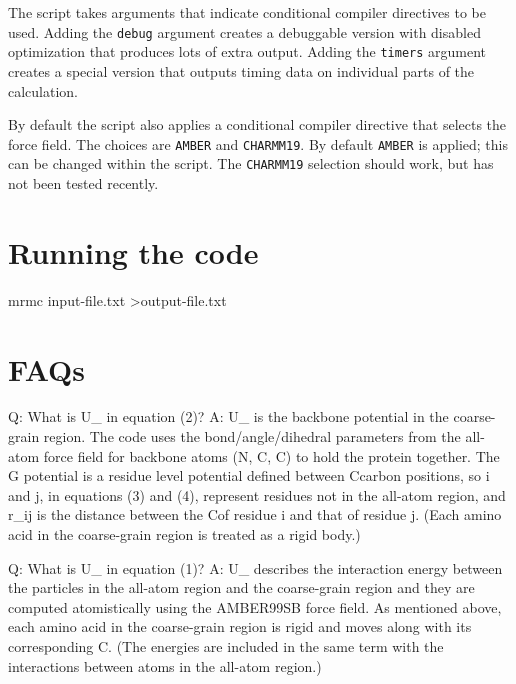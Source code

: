 \documentclass{article}      %
\begin{document}
The script takes arguments that indicate conditional compiler directives to be used.  Adding the \verb+debug+ argument creates a debuggable version with disabled optimization that produces lots of extra output.  Adding the \verb+timers+ argument creates a special version that outputs timing data on individual parts of the calculation.

By default the script also applies a conditional compiler directive that selects the force field.  The choices are \verb+AMBER+ and \verb+CHARMM19+.   By default \verb+AMBER+ is applied; this can be changed within the script.    The \verb+CHARMM19+ selection should work, but has not been tested recently.   


\section{Running the code}

mrmc input-file.txt >output-file.txt


\section{FAQs}

Q:  What is U_ in equation (2)?
A:  U_ is the backbone potential in the coarse-grain region.  The code uses the bond/angle/dihedral parameters from the all-atom force field for backbone atoms (N, C\alpha, C) to hold the protein together.  The G potential is a residue level potential defined between C\alpha carbon positions, so i and j, in equations (3) and (4), represent residues not in the all-atom region, and r_{ij} is the distance between the C\alpha of residue i and that of residue j.  (Each amino acid in the coarse-grain region is treated as a rigid body.)

Q:  What is U_ in equation (1)?
A:  U_ describes the interaction energy between the particles in the all-atom region and the coarse-grain region and they are computed atomistically using the AMBER99SB force field.  As mentioned above, each amino acid in the coarse-grain region is rigid and moves along with its corresponding C\alpha.  (The energies are included in the same term with the interactions between atoms in the all-atom region.)  
\end{document}
